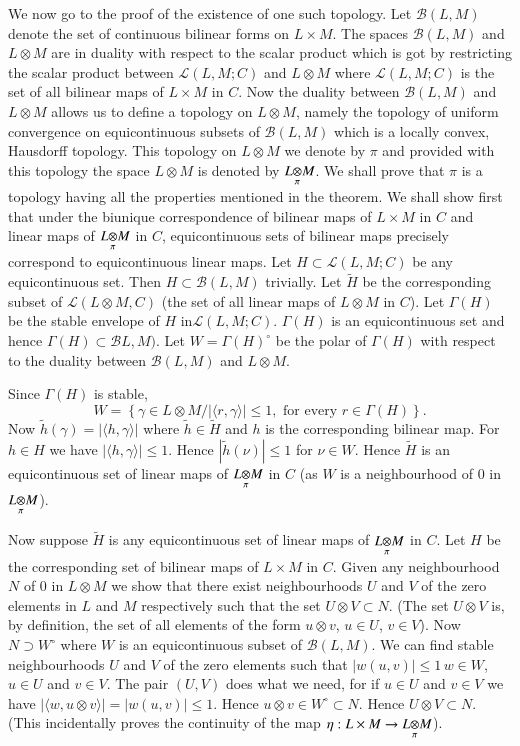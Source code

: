 We now go to the proof of the existence of one such topology. Let
$\mathscr{B}(L, M)$ denote the set of continuous bilinear forms on $L
\times M$. The spaces $\mathscr{B}(L, M)$ and $L \otimes M$ are in
duality with respect to the scalar product which is got by restricting
the scalar product between $\mathscr{L}(L, M; C)$ and $L \otimes M$
where $\mathscr{L}(L, M; C)$ is the set of all bilinear maps of $L
\times M$ in $C$. Now the duality between $\mathscr{B}(L, M)$ and $L
\otimes M$ allows us to define a topology on $L \otimes M$, namely the
topology of uniform convergence on equicontinuous subsets of
$\mathscr{B}(L, M)$ which is a locally convex, Hausdorff
topology. This topology on $L \otimes M$ we denote by $\pi$ and
provided with this topology the space $L \otimes M$ is denoted by 
$L{\displaystyle\mathop{\otimes}_{\pi}}M$. We shall prove that $\pi$ is a topology
having all the properties mentioned in the theorem. We shall show
first that under the biunique correspondence of bilinear maps of $L
\times M$ in $C$ and linear maps of $L{\displaystyle\mathop{\otimes}_{\pi}}M$ in $C$,
equicontinuous sets of bilinear maps precisely correspond to
equicontinuous linear maps. Let $H \subset \mathscr{L}(L, M; C)$ be
any equicontinuous set. Then $H \subset \mathscr{B}(L, M)$
trivially. Let $\tilde{H}$ be the corresponding subset of
$\mathscr{L}(L\otimes M, C)$ (the set of all linear maps of $L\otimes
M$ in $C$). Let $\Gamma(H)$ be the stable envelope of $H$
in\pageoriginale $\mathscr{L}(L, M; C)$. $\Gamma (H)$ is an
equicontinuous set and hence $\Gamma(H)\subset \mathscr{B} L, M)$. Let
$W=\Gamma (H)^\circ$ be the polar of $\Gamma(H)$ with respect to the
duality between $\mathscr{B}(L, M)$ and $L \otimes M$. 

Since $\Gamma(H)$ is stable, 
$$W=\left\{\gamma \in L \otimes M /
|\langle r, \gamma \rangle | \leq 1,  \text{ for every }
r\in \Gamma(H) \right \}.$$ 
Now $\tilde{h}(\gamma) = |\langle h,
\gamma \rangle |$ where $\tilde{h} \in \tilde{H}$ and $h$ is the
corresponding bilinear map. For $h \in H$ we have $|\langle h, \gamma
\rangle | \leq  1$. Hence $|\tilde{h}(\nu)| \leq 1$ for $\nu \in
W$. Hence $\tilde{H}$ is an equicontinuous set of linear maps of 
$L{\displaystyle\mathop{\otimes}_{\pi}}M$ in $C$ (as $W$ is a neighbourhood of $0$ in
$L{\displaystyle\mathop{\otimes}_{\pi}}M$).

Now suppose $\tilde{H}$ is any equicontinuous set of linear maps of 
$L{\displaystyle\mathop{\otimes}_{\pi}}M$ in $C$. Let $H$ be the corresponding set of
bilinear maps of $L \times M$ in $C$. Given any neighbourhood $N$ of
$0$ in $L \otimes M$ we show that there exist neighbourhoods $U$ and
$V$ of the zero elements in $L$ and $M$ respectively such that the
set $U \otimes V \subset N$. (The set $U\otimes V$ is, by definition,
the set of all elements of the form $u \otimes v$, $u \in U$, $v \in
V$). Now $N \supset W^\circ$ where $W$ is an equicontinuous subset of
$\mathscr{B}(L, M)$. We can find stable neighbourhoods $U$ and $V$ of
the zero elements such that $|w(u,v)| \leq 1\,w \in W$, $u \in U$ and
$v \in V$. The pair $(U, V)$ does what we need, for if $u \in U$ and
$v \in V$ we have $|\langle w, u \otimes v \rangle | = | w(u, v)| \leq
1$. Hence $u\otimes v \in W^\circ \subset N$. Hence $U\otimes V
\subset N$. (This incidentally proves the continuity of the map $\eta
: L \times M \to L{\displaystyle\mathop{\otimes}_{\pi}}M$).

